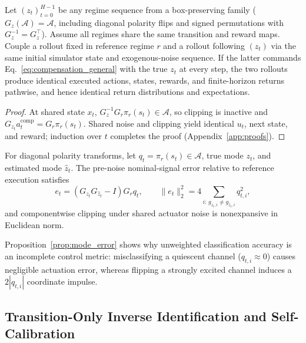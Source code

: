 \documentclass[twoside,11pt]{article}
\newcommand{\gain}{G}
\begin{document}
\begin{proposition}
\label{prop:equivalence}
Let $(z_t)_{t=0}^{H-1}$ be any regime sequence from a box-preserving family ($\gain_z(\mathcal{A})=\mathcal{A}$, including diagonal polarity flips and signed permutations with $\gain_z^{-1}=\gain_z^\top$). Assume all regimes share the same transition and reward maps. Couple a rollout fixed in reference regime $r$ and a rollout following $(z_t)$ via the same initial simulator state and exogenous-noise sequence. If the latter commands Eq.~\eqref{eq:compensation_general} with the true $z_t$ at every step, the two rollouts produce identical executed actions, states, rewards, and finite-horizon returns pathwise, and hence identical return distributions and expectations.
\end{proposition}
\begin{proof}
At shared state $x_t$, $\gain_z^{-1}\gain_r\pi_r(s_t)\in\mathcal{A}$, so clipping is inactive and $\gain_{z_t}a_t^{\mathrm{comp}}=\gain_r\pi_r(s_t)$. Shared noise and clipping yield identical $u_t$, next state, and reward; induction over $t$ completes the proof (Appendix~\ref{app:proofs}).
\end{proof}

\begin{proposition}
\label{prop:mode_error}
For diagonal polarity transforms, let $q_t=\pi_r(s_t)\in\mathcal{A}$, true mode $z_t$, and estimated mode $\hat z_t$. The pre-noise nominal-signal error relative to reference execution satisfies
\begin{equation}
 e_t=\left(\gain_{z_t}\gain_{\hat z_t}-I\right)\gain_r q_t,
 \qquad
 \|e_t\|_2^2=4\!\sum_{i:\,g_{z_t,i}\ne g_{\hat z_t,i}}q_{t,i}^2,
 \label{eq:weighted_mode_error}
\end{equation}
and componentwise clipping under shared actuator noise is nonexpansive in Euclidean norm.
\end{proposition}
Proposition~\ref{prop:mode_error} shows why unweighted classification accuracy is an incomplete control metric: misclassifying a quiescent channel ($q_{t,i}\approx 0$) causes negligible actuation error, whereas flipping a strongly excited channel induces a $2|q_{t,i}|$ coordinate impulse.

\subsection{Transition-Only Inverse Identification and Self-Calibration}
\end{document}
